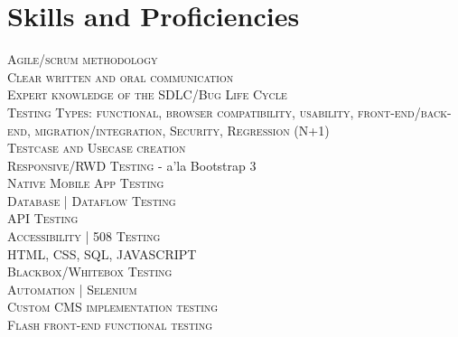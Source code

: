 \documentclass[a4paper,10pt]{article}
\begin{document}
\section{Skills and Proficiencies}
\begin{flushleft}
\textsc{Agile/scrum methodology}\\ \textsc{Clear written and oral communication}\\ \textsc{Expert knowledge of the SDLC/Bug Life Cycle}\\ \textsc{Testing Types: functional, browser compatibility, usability, front-end/back-end, migration/integration, Security, Regression (N+1)}\\ \textsc{Testcase and Usecase creation}\\ \textsc{Responsive/RWD Testing} - a'la {Bootstrap 3}\\ \textsc{Native Mobile App Testing}\\ \textsc{Database | Dataflow Testing}\\ \textsc{API Testing}\\ \textsc{Accessibility | 508 Testing}\\  \textsc{HTML, CSS, SQL, JAVASCRIPT}\\\textsc{Blackbox/Whitebox Testing}\\ \textsc{Automation | Selenium}\\ \textsc{Custom CMS implementation testing}\\ \textsc{Flash front-end functional testing}\\
\end{flushleft}


\vspace{115 mm}
\begin{center}
\end{center}
\end{document}
